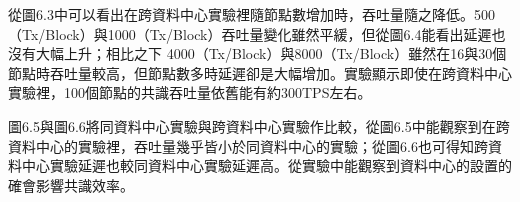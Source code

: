 \newpage
從圖6.3中可以看出在跨資料中心實驗裡隨節點數增加時，吞吐量隨之降低。500（Tx/Block）與1000（Tx/Block）吞吐量變化雖然平緩，但從圖6.4能看出延遲也沒有大幅上升；相比之下 4000（Tx/Block）與8000（Tx/Block）雖然在16與30個節點時吞吐量較高，但節點數多時延遲卻是大幅增加。實驗顯示即使在跨資料中心實驗裡，100個節點的共識吞吐量依舊能有約300TPS左右。




\newpage
圖6.5與圖6.6將同資料中心實驗與跨資料中心實驗作比較，從圖6.5中能觀察到在跨資料中心的實驗裡，吞吐量幾乎皆小於同資料中心的實驗；從圖6.6也可得知跨資料中心實驗延遲也較同資料中心實驗延遲高。從實驗中能觀察到資料中心的設置的確會影響共識效率。




